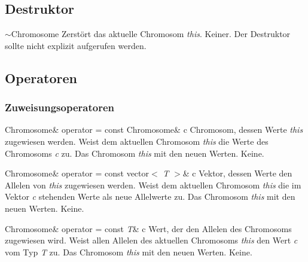 \documentclass{report}
\begin{document}
\subsection{Destruktor}

    \printEmptyMethodReturnSpecial
        {}
        {$\sim$Chromosome}
        {Zerst\"ort das aktuelle Chromosom 
         {\em this}.}
        {Keiner.}
        {Der Destruktor sollte nicht explizit aufgerufen werden.}

\newpage

\subsection{Operatoren}
\subsubsection{Zuweisungsoperatoren}

    \printMethodWithOneParam
        {Chromosome\&}
        {operator = } 
        {const Chromosome\&}
        {c} 
        {Chromosom, dessen Werte {\em this} zugewiesen werden.}
        {Weist dem aktuellen Chromosom {\em this} die 
         Werte des Chromosoms {\em c} zu.}
        {Das Chromosom {\em this} mit den neuen Werten.}
        {Keine.}

\vspace{4ex}

    \printMethodWithOneParam
        {Chromosome\&}  
        {operator = } 
        {const vector$<$ {\sl T} $>$\&}
        {c} 
        {Vektor, dessen Werte den Allelen von {\em this} zugewiesen werden.}
        {Weist dem aktuellen Chromosom {\em this} die 
         im Vektor {\em c} stehenden Werte als neue Allelwerte zu.}
        {Das Chromosom {\em this} mit den neuen Werten.}
        {Keine.}

\vspace{4ex}

    \printMethodWithOneParam
        {Chromosome\&}  
        {operator = } 
        {const {\sl T}\&}
        {c} 
        {Wert, der den Allelen des Chromosoms zugewiesen wird.}
        {Weist allen Allelen des aktuellen Chromosoms 
         {\em this} den Wert {\em c} vom Typ {\sl T} zu.}
        {Das Chromosom {\em this} mit den neuen Werten.}
        {Keine.}
\end{document}
